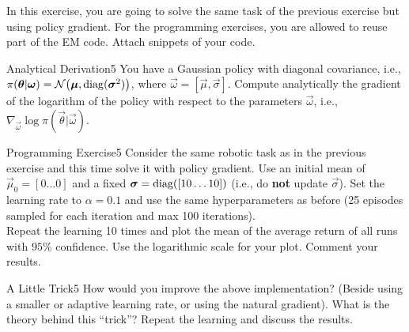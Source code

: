 In this exercise, you are going to solve the same task of the previous exercise but using policy gradient. 
For the programming exercises, you are allowed to reuse part of the EM code. 
Attach snippets of your code.

\begin{questions}


\begin{question}{Analytical Derivation}{5}
 	You have a Gaussian policy with diagonal covariance, i.e., $\pi({\boldsymbol{\theta}} | {\boldsymbol{\omega}}) = \mathcal{N}\big({\boldsymbol{\mu}}, \operatorname{\mathrm{diag}}({\boldsymbol{\sigma}}^2)\big)$, where $\vec \omega = [\vec \mu,\vec \sigma]$.
 	Compute analytically the gradient of the logarithm of the policy with respect to the parameters $\vec\omega$, i.e., $\nabla_{\vec\omega} \log \pi(\vec \theta | \vec \omega)$.
 	
\begin{answer}\end{answer}

\end{question}


\begin{question}{Programming Exercise}{5}
	Consider the same robotic task as in the previous exercise and this time solve it with policy gradient. 
	Use an initial mean of $\vec \mu_0 = [0 \dots 0]$ and a fixed ${\boldsymbol{\sigma}} = \operatorname{\mathrm{diag}}([10 \dots 10])$ (i.e., do \textbf{not} update $\vec\sigma$). Set the learning rate to $\alpha=0.1$ and use the same hyperparameters as before (25 episodes sampled for each iteration and max 100 iterations).\\
	Repeat the learning 10 times and plot the mean of the average return of all runs with $95\%$ confidence.
	Use the logarithmic scale for your plot. Comment your results.
	
\begin{answer}\end{answer}
\end{question}




\begin{question}{A Little Trick}{5}
	How would you improve the above implementation? (Beside using a smaller or adaptive learning rate, or using the natural gradient). What is the theory behind this ``trick''? Repeat the learning and discuss the results.
	

\end{question}
\end{questions}
